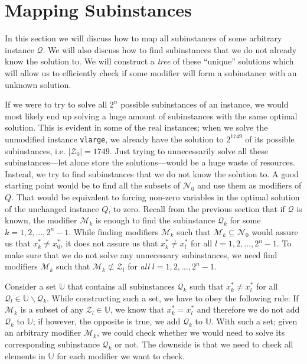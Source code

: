 \section{Mapping Subinstances}
In this section we will discuss how to map all subinstances of some arbitrary
instance $\mathcal{Q}$. We will also discuss how to find 
subinstances that we do not already know the solution to.
We will construct a \emph{tree} of these ``unique'' solutions which will allow
us to efficiently check if some modifier will form a subinstance with an
unknown solution.

If we were to try to solve all $2^n$ possible subinstances of an
instance, we would most likely end up solving a huge amount of subinstances
with the same optimal solution. This is evident in some of the real
instances; when we solve the unmodified instance \texttt{vlarge}, we already
have the solution to $2^{1749}$ of its possible subinstances, i.e.
$|\mathcal{Z}_0| = 1749$.
Just trying to unnecessarily solve all these subinstances---let alone store the
solutions---would be a huge waste of resources.
Instead, we try to find subinstances that we do not know the solution to.
A good starting point would be to find all the subsets of $\mathcal{N}_0$ and
use them as modifiers of $Q$. That would be equivalent to forcing non-zero
variables in the optimal solution of the unchanged instance $Q$, to zero.
Recall from the previous section that if $\mathcal{Q}$ is known, the modifier
$\mathcal{M}_k$ is enough to find the subinstance $\mathcal{Q}_k$ for some
$k=1,2,\ldots,2^n-1$.
While finding modifiers $\mathcal{M}_k$ such that
$\mathcal{M}_k \subseteq \mathcal{N}_0$ would assure us that $x_k^*\neq x_0^*$,
it does not assure us that $x_k^* \neq x_l^*$ for all $l=1,2,\ldots,2^n-1$.
To make sure that we do not solve any unnecessary subinstances, we need
find modifiers $\mathcal{M}_k$ such that
$\mathcal{M}_k \not \subset \mathcal{Z}_l$
for \emph{all} $l=1,2,\ldots,2^n-1$.

Consider a set $\mathbb{U}$ that contains all subinstances $\mathcal{Q}_k$
such that $x_k^* \neq x_l^*$ for all
$\mathcal{Q}_l \in \mathbb{U} \backslash \mathcal{Q}_k$.
While constructing such a set, we have to obey the following rule:
If $\mathcal{M}_k$ is a subset of any $\mathcal{Z}_l \in \mathbb{U}$, we know
that $x_k^* = x_l^*$ and therefore we do not add $\mathcal{Q}_k$ to
$\mathbb{U}$;
if however, the opposite is true, we add $\mathcal{Q}_k$ to $\mathbb{U}$.
With such a set; given an arbitrary modifier $\mathcal{M}_k$, we could check
whether we would need to solve its corresponding subinstance $\mathcal{Q}_k$ or
not.
The downside is that we need to check all elements in $\mathbb{U}$ for
each modifier we want to check.

